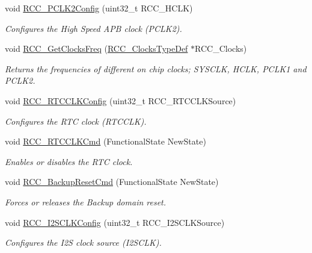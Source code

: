 \begin{DoxyCompactItemize}
void \hyperlink{group___r_c_c_ga09f9c010a4adca9e036da42c2ca6126a}{R\+C\+C\+\_\+\+P\+C\+L\+K2\+Config} (uint32\+\_\+t R\+C\+C\+\_\+\+H\+C\+LK)
\begin{DoxyCompactList}\small\item\em Configures the High Speed A\+PB clock (P\+C\+L\+K2). \end{DoxyCompactList}\item 
void \hyperlink{group___r_c_c_ga3e9944fd1ed734275222bbb3e3f29993}{R\+C\+C\+\_\+\+Get\+Clocks\+Freq} (\hyperlink{struct_r_c_c___clocks_type_def}{R\+C\+C\+\_\+\+Clocks\+Type\+Def} $\ast$R\+C\+C\+\_\+\+Clocks)
\begin{DoxyCompactList}\small\item\em Returns the frequencies of different on chip clocks; S\+Y\+S\+C\+LK, H\+C\+LK, P\+C\+L\+K1 and P\+C\+L\+K2. \end{DoxyCompactList}\item 
void \hyperlink{group___r_c_c_ga1473d8a5a020642966359611c44181b0}{R\+C\+C\+\_\+\+R\+T\+C\+C\+L\+K\+Config} (uint32\+\_\+t R\+C\+C\+\_\+\+R\+T\+C\+C\+L\+K\+Source)
\begin{DoxyCompactList}\small\item\em Configures the R\+TC clock (R\+T\+C\+C\+LK). \end{DoxyCompactList}\item 
void \hyperlink{group___r_c_c_ga9802f84846df2cea8e369234ed13b159}{R\+C\+C\+\_\+\+R\+T\+C\+C\+L\+K\+Cmd} (Functional\+State New\+State)
\begin{DoxyCompactList}\small\item\em Enables or disables the R\+TC clock. \end{DoxyCompactList}\item 
void \hyperlink{group___r_c_c_ga636c3b72f35391e67f12a551b15fa54a}{R\+C\+C\+\_\+\+Backup\+Reset\+Cmd} (Functional\+State New\+State)
\begin{DoxyCompactList}\small\item\em Forces or releases the Backup domain reset. \end{DoxyCompactList}\item 
void \hyperlink{group___r_c_c_ga6c56f8529988fcc8f4dbffbc1bab27d0}{R\+C\+C\+\_\+\+I2\+S\+C\+L\+K\+Config} (uint32\+\_\+t R\+C\+C\+\_\+\+I2\+S\+C\+L\+K\+Source)
\begin{DoxyCompactList}\small\item\em Configures the I2S clock source (I2\+S\+C\+LK). \end{DoxyCompactList}\item 

\end{DoxyCompactItemize}
